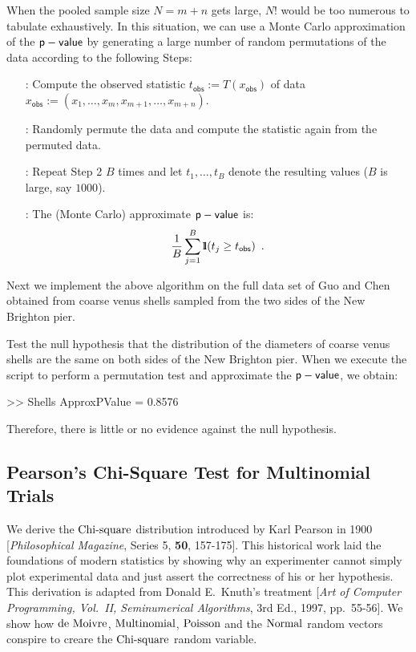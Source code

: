 When the pooled sample size $N=m+n$ gets large, $N!$ would be too numerous to tabulate exhaustively.  In this situation, we can use a Monte Carlo approximation of the $\mathsf{p-value}$ by generating a large number of random permutations of the data according to the following Steps:

\begin{enumerate}
\item[\sf{Step 1}:] Compute the observed statistic $t_{\mathsf{obs}} := T(x_{\mathsf{obs}})$ of data $x_{\mathsf{obs}}:=(x_1,\ldots,x_m,x_{m+1},\ldots,x_{m+n})$.
\item[\sf{Step 2}:] Randomly permute the data and compute the statistic again from the permuted data.
\item[\sf{Step 3}:] Repeat {\sf Step 2} $B$ times and let $t_1,\ldots,t_B$ denote the resulting values ($B$ is large, say $1000$).
\item[\sf{Step 4}:] The (Monte Carlo) approximate $\mathsf{p-value}$ is:
\[
\frac{1}{B} \sum_{j=1}^B {1}\mspace{-11 mu}{1}(t_j \geq t_{\mathsf{obs}} ) \enspace .
\]
\end{enumerate}
Next we implement the above algorithm on the full data set of Guo and Chen obtained from coarse venus shells sampled from the two sides of the New Brighton pier. 
\begin{labwork}\label{LW:Shells}
Test the null hypothesis that the distribution of the diameters of coarse venus shells are the same on both sides of the New Brighton pier. 
When we execute the script to perform a permutation test and approximate the $\mathsf{p-value}$, we obtain:
\begin{VrbM}
>> Shells
ApproxPValue =    0.8576
\end{VrbM}
Therefore, there is little or no evidence against the null hypothesis.
\end{labwork}

\subsection{Pearson's Chi-Square Test for Multinomial Trials}\label{S:Chi2}

We derive the $\mbox{{\rm Chi-square}}$ distribution introduced by Karl Pearson in 1900 [{\em Philosophical Magazine}, Series 5, {\bf 50}, 157-175].  This historical work laid the foundations of modern statistics by showing why an experimenter cannot simply plot experimental data and just assert the correctness of his or her hypothesis.  This derivation is adapted from Donald E.~Knuth's treatment [{\em Art of Computer Programming, Vol.~II, Seminumerical Algorithms}, 3rd Ed., 1997, pp.~55-56].  We show how $\mbox{{\rm de~Moivre}}$, $\mbox{{\rm Multinomial}}$, $\mbox{{\rm Poisson}}$ and the $\mbox{{\rm Normal}}$ random vectors conspire to creare the $\mbox{{\rm Chi-square}}$ random variable.

